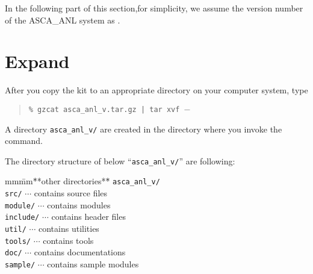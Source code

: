 In the following part of this section,for simplicity,
we assume the version number of the ASCA\_ANL system as \ANLversion .

\section{Expand}
After you copy the kit to an appropriate directory on your computer system,
type
\begin{quote}
   {\tt \%  gzcat asca\_anl\_v\ANLversion .tar.gz | tar xvf $-$}
\end{quote}
A directory {\tt asca\_anl\_v\ANLversion /} are created
in the directory where you invoke the command.

The directory structure of below ``{\tt asca\_anl\_v\ANLversion /}''
are following:
\begin{tabbing}
mm\=mm\=**other directories**\=\kill
{\tt asca\_anl\_v\ANLversion/} \\
	\> {\tt src/}	 \>	\> $\cdots$ contains source files\\
	\> {\tt module/} \>	\> $\cdots$ contains modules\\
        \> {\tt include/}\>	\> $\cdots$ contains header files\\
	\> {\tt util/} 	 \>	\> $\cdots$ contains utilities\\
	\> {\tt tools/}  \>	\> $\cdots$ contains tools\\
	\> {\tt doc/} 	 \>	\> $\cdots$ contains documentations\\
	\> {\tt sample/} \>     \> $\cdots$ contains sample modules\\
\end{tabbing}

